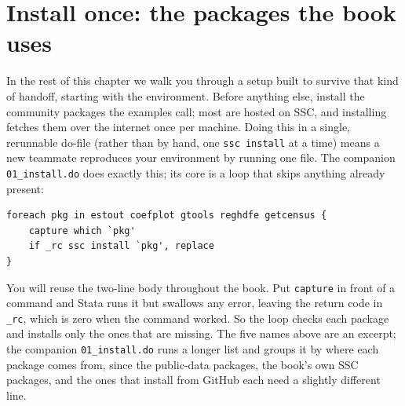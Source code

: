 \documentclass[
    a4paper,
    fontsize=10pt,
    twoside=true,
    numbers=noenddot,
]{kaobook}
\begin{document}
\section{Install once: the packages the book uses}\label{sec:ch02-install}
In the rest of this chapter we walk you through a setup built to survive that kind of handoff, starting with the environment. Before anything else, install the community packages the examples call; most are hosted on SSC, and installing fetches them over the internet once per machine. Doing this in a single, rerunnable do-file (rather than by hand, one \texttt{ssc install} at a time) means a new teammate reproduces your environment by running one file. The companion \texttt{01\_install.do} does exactly this; its core is a loop that skips anything already present:
\par
{\footnotesize
\begin{verbatim}
foreach pkg in estout coefplot gtools reghdfe getcensus {
    capture which `pkg'
    if _rc ssc install `pkg', replace
}
\end{verbatim}
}
You will reuse the two-line body throughout the book. Put \texttt{capture} in front of a command and Stata runs it but swallows any error, leaving the return code in \texttt{\_rc}, which is zero when the command worked. So the loop checks each package and installs only the ones that are missing. The five names above are an excerpt; the companion \texttt{01\_install.do} runs a longer list and groups it by where each package comes from, since the public-data packages, the book's own SSC packages, and the ones that install from GitHub each need a slightly different line.
\end{document}
